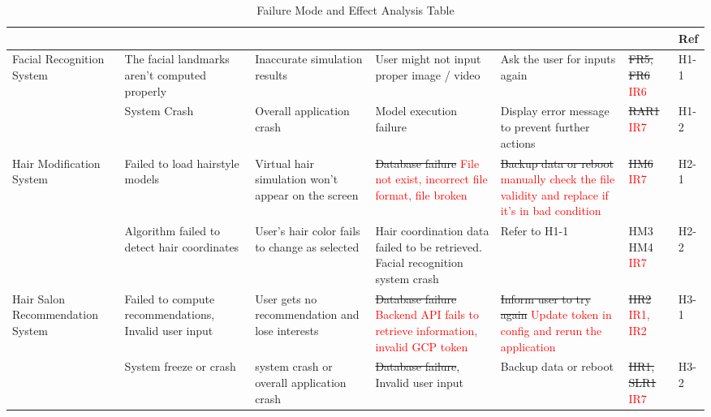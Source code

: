 \documentclass{article}
\begin{document}
\begin{landscape}
\begin{table}[h!]
\def\arraystretch{1.7}
\begin{tabularx}{1.2\textwidth} { |X|X|X|X|X
  | p{0.9cm}
  | p{0.9cm} | }
\hline
	\centering{Component} & \centering{Failure Mode} & \centering{Effects of Failure} & \centering{Causes of Failure} & \centering{Recommended Action} & \centering{SR} & Ref \\ \hline
    Facial Recognition System & The facial landmarks aren't computed properly & Inaccurate simulation results & User might not input proper image / video & Ask the user for inputs again & \sout{FR5, FR6} \textcolor{red}{IR6} & H1-1 \\ \cline{2-7}
     & System Crash & Overall application crash & Model execution failure & Display error message to prevent further actions & \sout{RAR1} \textcolor{red}{IR7} & H1-2 \\ \hline
     
     Hair Modification System & Failed to load hairstyle models & Virtual hair simulation won't appear on the screen  & \sout{Database failure} \textcolor{red}{File not exist, incorrect file format, file broken}  & \sout{Backup data or reboot} \textcolor{red}{manually check the file validity and replace if it's in bad condition} & \sout{HM6} \textcolor{red}{IR7} & H2-1 \\  \cline{2-7}
     
     ~ & Algorithm failed to detect hair coordinates  & User's hair color fails to change as selected  &  
     Hair coordination data failed to be retrieved. \newline 
     Facial recognition system crash
     & Refer to H1-1 & \sout{HM3 \newline HM4} \textcolor{red}{IR7} & H2-2 \\ \hline
     
     Hair Salon Recommendation System & Failed to compute recommendations, Invalid user input & User gets no recommendation and lose interests & \sout{Database failure} \textcolor{red}{Backend API fails to retrieve information, invalid GCP token} & \sout{Inform user to try again} \textcolor{red}{Update token in config and rerun the application} & \sout{HR2} \textcolor{red}{IR1, IR2} & H3-1 \\ \cline{2-7}
     ~ & System freeze or crash & system crash or overall application crash & \sout{Database failure}, Invalid user input & Backup data or reboot & \sout{HR1, SLR1} \textcolor{red}{IR7} & H3-2 \\ \hline
     

\end{tabularx}
\caption{Failure Mode and Effect Analysis Table}
\label{FMEA Table}
\end{table}
\end{landscape}
\end{document}
